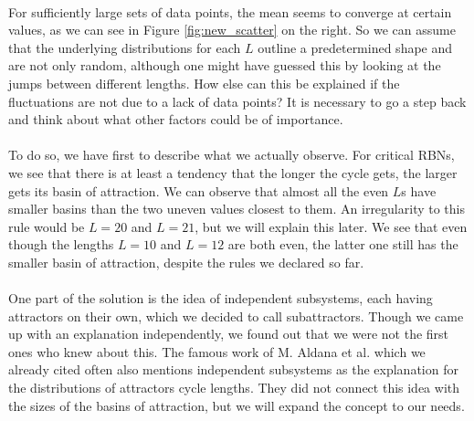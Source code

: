 \paragraph*{}
For sufficiently large sets of data points, the mean seems to converge at certain values, as we can see in Figure \ref{fig:new_scatter} on the right. So we can assume that the underlying distributions for each $ L $ outline a predetermined shape and are not only random, although one might have guessed this by looking at the jumps between different lengths. How else can this be explained if the fluctuations are not due to a lack of data points? It is necessary to go a step back and think about what other factors could be of importance.

\paragraph*{}
To do so, we have first to describe what we actually observe. For critical RBNs, we see that there is at least a tendency that the longer the cycle gets, the larger gets its basin of attraction. We can observe that almost all the even $L$s have smaller basins than the two uneven values closest to them. An irregularity to this rule would be $L=20$ and $L=21$, but we will explain this later. We see that even though the lengths $L=10$ and $L=12$ are both even, the latter one still has the smaller basin of attraction, despite the rules we declared so far.


\paragraph*{}
One part of the solution is the idea of independent subsystems, each having attractors on their own, which we decided to call subattractors. Though we came up with an explanation independently, we found out that we were not the first ones who knew about this. The famous work of M. Aldana et al. \cite{aldana2003boolean} which we already cited often also mentions independent subsystems as the explanation for the distributions of attractors cycle lengths. They did not connect this idea with the sizes of the basins of attraction, but we will expand the concept to our needs.

